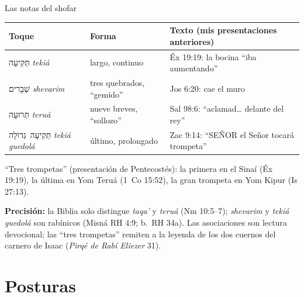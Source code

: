 \documentclass[hyperref={bookmarks=false},aspectratio=169]{beamer}
\newcommand{\heb}[1]{\mbox{\foreignlanguage{hebrew}{#1}}}
\newcommand{\SENOR}{S{\fontsize{0.78em}{1em}\selectfont EÑOR}}
\newcommand{\precision}[1]{{\footnotesize\color{sepia}\textbf{Precisión:} #1}}
\begin{document}
\begin{frame}{Las notas del shofar}
\renewcommand{\arraystretch}{1.15}\small
\begin{tabular}{@{}L{3.0cm}L{3.4cm}L{5.2cm}@{}}
\toprule
\textbf{Toque} & \textbf{Forma} & \textbf{Texto (mis presentaciones anteriores)} \\ \midrule
\heb{תְּקִיעָה} \emph{tekiá} & largo, continuo & Éx 19:19: la bocina ``iba aumentando'' \\
\heb{שְׁבָרִים} \emph{shevarim} & tres quebrados, ``gemido'' & Jos 6:20: cae el muro \\
\heb{תְּרוּעָה} \emph{teruá} & nueve breves, ``sollozo'' & Sal 98:6: ``aclamad\ldots{} delante del rey'' \\
\heb{תְּקִיעָה גְדוֹלָה} \emph{tekiá guedolá} & último, prolongado & Zac 9:14: ``\SENOR{} el Señor tocará trompeta'' \\
\bottomrule
\end{tabular}\par\medskip
\scriptsize\RaggedRight ``Tres trompetas'' (presentación de Pentecostés): la primera en el Sinaí (Éx 19:19), la última en Yom Teruá (1~Co 15:52), la gran trompeta en Yom Kipur (Is 27:13).\par\smallskip
\precision{la Biblia solo distingue \emph{taqa'} y \emph{teruá} (Nm 10:5--7); \emph{shevarim} y \emph{tekiá guedolá} son rabínicos (Misná RH 4:9; b.~RH 34a). Las asociaciones son lectura devocional; las ``tres trompetas'' remiten a la leyenda de los dos cuernos del carnero de Isaac (\emph{Pirqé de Rabí Eliezer} 31).}
\end{frame}

\section{Posturas}
\end{document}
